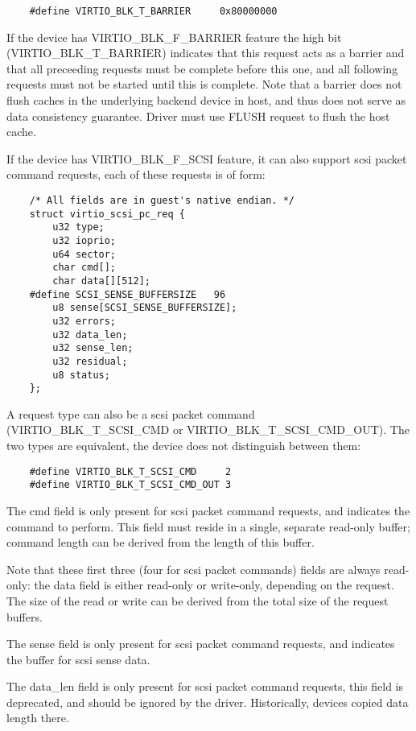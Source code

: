 \begin{lstlisting}
	#define VIRTIO_BLK_T_BARRIER	 0x80000000
\end{lstlisting}

If the device has VIRTIO_BLK_F_BARRIER
feature the high bit (VIRTIO_BLK_T_BARRIER) indicates that this
request acts as a barrier and that all preceeding requests must be
complete before this one, and all following requests must not be
started until this is complete. Note that a barrier does not flush
caches in the underlying backend device in host, and thus does not
serve as data consistency guarantee. Driver must use FLUSH request to
flush the host cache.

If the device has VIRTIO_BLK_F_SCSI feature, it can also support
scsi packet command requests, each of these requests is of form:

\begin{lstlisting}
	/* All fields are in guest's native endian. */
	struct virtio_scsi_pc_req {
		u32 type;
		u32 ioprio;
		u64 sector;
		char cmd[];
		char data[][512];
	#define SCSI_SENSE_BUFFERSIZE   96
		u8 sense[SCSI_SENSE_BUFFERSIZE];
		u32 errors;
		u32 data_len;
		u32 sense_len;
		u32 residual;
		u8 status;
	};
\end{lstlisting}

A request type can also be a scsi packet command (VIRTIO_BLK_T_SCSI_CMD or
VIRTIO_BLK_T_SCSI_CMD_OUT).  The two types are equivalent, the device
does not distinguish between them:

\begin{lstlisting}
	#define VIRTIO_BLK_T_SCSI_CMD     2
	#define VIRTIO_BLK_T_SCSI_CMD_OUT 3
\end{lstlisting}

The cmd field is only present for scsi packet command requests,
and indicates the command to perform. This field must reside in a
single, separate read-only buffer; command length can be derived
from the length of this buffer.

Note that these first three (four for scsi packet commands)
fields are always read-only: the data field is either read-only
or write-only, depending on the request. The size of the read or
write can be derived from the total size of the request buffers.

The sense field is only present for scsi packet command requests,
and indicates the buffer for scsi sense data.

The data_len field is only present for scsi packet command
requests, this field is deprecated, and should be ignored by the
driver. Historically, devices copied data length there.

